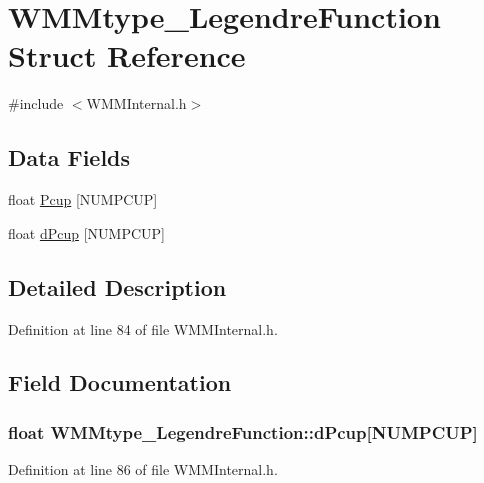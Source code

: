 \hypertarget{struct_w_m_mtype___legendre_function}{\section{\-W\-M\-Mtype\-\_\-\-Legendre\-Function \-Struct \-Reference}
\label{struct_w_m_mtype___legendre_function}
}


{\ttfamily \#include $<$\-W\-M\-M\-Internal.\-h$>$}

\subsection*{\-Data \-Fields}
\begin{DoxyCompactItemize}
\item 
float \hyperlink{struct_w_m_mtype___legendre_function_a3059147ef5db575cff502086ffd6181e}{\-Pcup} \mbox{[}\-N\-U\-M\-P\-C\-U\-P\mbox{]}
\item 
float \hyperlink{struct_w_m_mtype___legendre_function_a8f1880bdef934eee3bd52155cd214343}{d\-Pcup} \mbox{[}\-N\-U\-M\-P\-C\-U\-P\mbox{]}
\end{DoxyCompactItemize}


\subsection{\-Detailed \-Description}


\-Definition at line 84 of file \-W\-M\-M\-Internal.\-h.



\subsection{\-Field \-Documentation}
\hypertarget{struct_w_m_mtype___legendre_function_a8f1880bdef934eee3bd52155cd214343}{
\subsubsection[{d\-Pcup}]{\setlength{\rightskip}{0pt plus 5cm}float {\bf \-W\-M\-Mtype\-\_\-\-Legendre\-Function\-::d\-Pcup}\mbox{[}\-N\-U\-M\-P\-C\-U\-P\mbox{]}}}\label{struct_w_m_mtype___legendre_function_a8f1880bdef934eee3bd52155cd214343}


\-Definition at line 86 of file \-W\-M\-M\-Internal.\-h.

